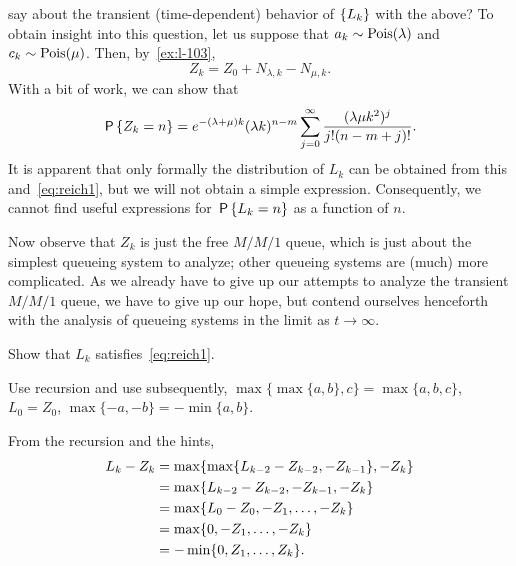  say about the transient (time-dependent) behavior of $\{\L_k\}$ with the above?
To obtain insight into this question, let us suppose that $a_k\sim \Pois{\lambda}$ and $c_k \sim \Pois{\mu}$.
Then, by~\cref{ex:l-103},
\begin{equation*}
 Z_k = Z_0+N_{\lambda, k} - N_{\mu, k}.
\end{equation*}
With a bit of work, we can show that
\begin{equation}\label{eq:rw2}
 \P{Z_k=n}
= e^{-(\lambda+\mu)k} (\lambda k)^{n-m} \sum_{j=0}^\infty
\frac{(\lambda\mu k^2)^j} {j!(n-m+j)!}.
\end{equation}
It is apparent that only formally the distribution of $L_{k}$ can be obtained from this and~\cref{eq:reich1}, but  we will not obtain a simple  expression. Consequently, we cannot find useful expressions for $\P{L_k=n}$ as a function of $n$.

Now observe that $Z_k$ is just the free $M/M/1$ queue, which is just about the simplest queueing system to analyze; other queueing systems are (much) more complicated. As we already have to give up our attempts to analyze the transient $M/M/1$ queue, we have to give up our hope, but contend ourselves henceforth with the analysis of queueing systems in the limit as $t\to\infty$.


\begin{exercise}\label{ex:l-133}
Show that $L_k$ satisfies~\cref{eq:reich1}.
\begin{hint}
  Use recursion and use subsequently,
$\max\{\max\{a,b\}, c\} = \max\{a,b,c\}$, $L_0 = Z_0$, $\max\{-a, -b \} = -\min\{a,b\}$.
\end{hint}
\begin{solution}
From the recursion and the hints,
\begin{equation*}
 \begin{split}
 L_k - Z_{k}
&= \max\{\max\{\L_{k-2} - Z_{k-2}, -Z_{k-1}\}, -Z_k\} \\
&= \max\{\L_{k-2} - Z_{k-2}, -Z_{k-1}, -Z_k\} \\
&= \max\{\L_{0} - Z_{0}, -Z_1, \ldots, -Z_k\} \\
&= \max\{0, -Z_1, \ldots, -Z_k\} \\
&= - \min\{0, Z_1, \ldots, Z_k\}.
 \end{split}
 \end{equation*}
\end{solution}
\end{exercise}


